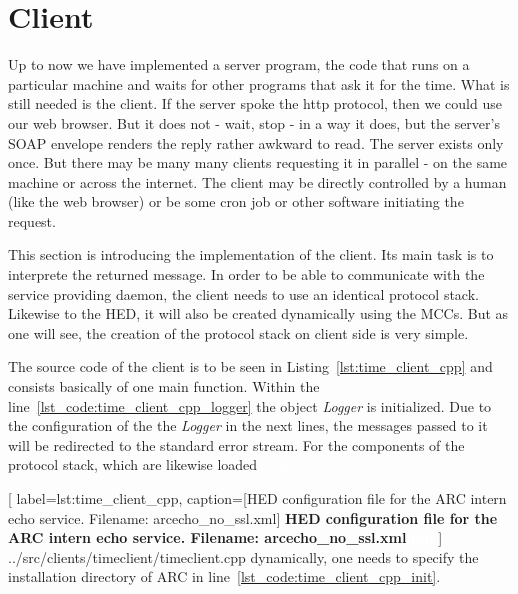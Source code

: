 \section{Client}\label{sec:timeservice_client}

Up to now we have implemented a server program, the code that runs on a particular machine and waits for other programs that ask it for the time. What is still needed is the client. If the server spoke the http protocol, then we could use our web browser. But it does not - wait, stop - in a way it does, but the server's SOAP envelope renders the reply rather awkward to read.   The server exists only once. But there may be many many clients requesting it in parallel - on the same machine or across the internet. The client may be directly controlled by a human (like the web browser) or be some cron job or other software initiating the request.

This section is introducing the implementation of the client.
Its main task is to interprete the returned message.
In order to be able to communicate with the service providing daemon, the client needs to use an identical protocol stack.
Likewise to the HED, it will also be created dynamically using the MCCs.
But as one will see, the creation of the protocol stack on client side is very simple.

The source code of the client is to be seen in Listing~\ref{lst:time_client_cpp} and consists basically of one main function.
Within the line~\ref{lst_code:time_client_cpp_logger} the object \textit{Logger} is initialized.
Due to the configuration of the the \textit{Logger} in the next lines, the messages passed to it will be redirected to the standard error stream.  For the components of the protocol stack, which  are likewise loaded \textcolor{white}{newline}

	[
	label=lst:time_client_cpp,
	caption={[HED configuration file for the ARC intern echo service. Filename: arcecho\_no\_ssl.xml]
	\textbf{HED configuration file for the ARC intern echo service. Filename: arcecho\_no\_ssl.xml\textcolor{white}{hmf}}}
	]
{../src/clients/timeclient/timeclient.cpp}
 dynamically, one needs to specify the installation directory of ARC in line~\ref{lst_code:time_client_cpp_init}.

